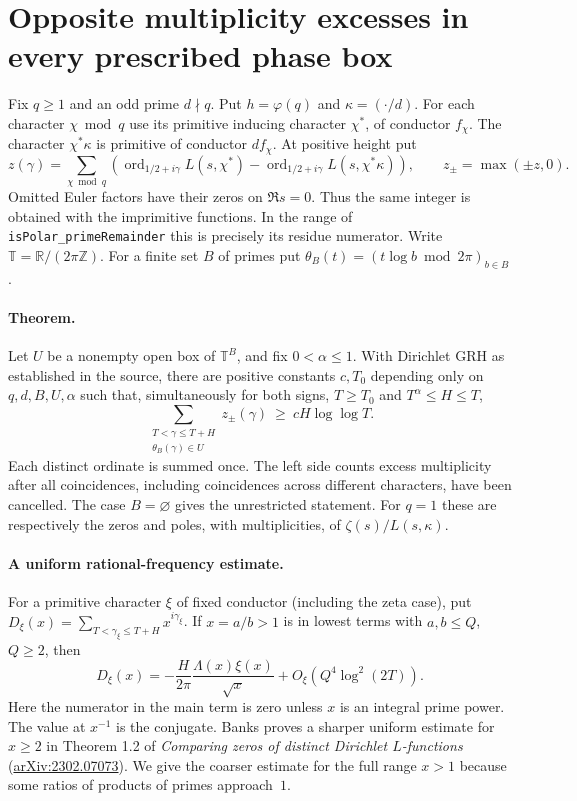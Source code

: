 \section{Opposite multiplicity excesses in every prescribed phase box}
\label{sec:localized}

Fix $q\ge1$ and an odd prime $d\nmid q$. Put $h=\varphi(q)$ and
$\kappa=(\cdot/d)$. For each character $\chi\bmod q$ use its primitive
inducing character $\chi^*$, of conductor $f_\chi$. The character
$\chi^*\kappa$ is primitive of conductor $df_\chi$. At positive height put
\[
 z(\gamma)=\sum_{\chi\bmod q}
 \left(\operatorname{ord}_{1/2+i\gamma}L(s,\chi^*)
      -\operatorname{ord}_{1/2+i\gamma}L(s,\chi^*\kappa)\right),
 \qquad z_\pm=\max(\pm z,0).
\]
Omitted Euler factors have their zeros on $\Re s=0$. Thus the same integer
is obtained with the imprimitive functions. In the range of
\texttt{isPolar\_primeRemainder} this is precisely its residue numerator.
Write $\mathbb T=\mathbb R/(2\pi\mathbb Z)$. For a finite set $B$ of
primes put $\theta_B(t)=(t\log b\bmod 2\pi)_{b\in B}$.

\paragraph{Theorem.}
Let $U$ be a nonempty open box of $\mathbb T^B$, and fix $0<\alpha\le1$.
With Dirichlet GRH as established in the source, there are positive
constants $c,T_0$ depending only on $q,d,B,U,\alpha$ such that, simultaneously
for both signs, $T\ge T_0$ and $T^\alpha\le H\le T$,
\begin{equation}
 \sum_{\substack{T<\gamma\le T+H\\\theta_B(\gamma)\in U}}z_\pm(\gamma)
    \ \ge\ c H\log\log T .
 \label{eq:phase-excess}
\end{equation}
Each distinct ordinate is summed once. The left side counts excess
multiplicity after all coincidences, including coincidences across
different characters, have been cancelled. The case $B=\varnothing$
gives the unrestricted statement. For $q=1$ these are respectively the
zeros and poles, with multiplicities, of $\zeta(s)/L(s,\kappa)$.

\paragraph{A uniform rational-frequency estimate.}
For a primitive character $\xi$ of fixed conductor (including the
zeta case), put
$D_\xi(x)=\sum_{T<\gamma_\xi\le T+H}x^{i\gamma_\xi}$.
If $x=a/b>1$ is in lowest terms with $a,b\le Q$, $Q\ge2$, then
\begin{equation}
 D_\xi(x)=-\frac{H}{2\pi}\frac{\Lambda(x)\xi(x)}{\sqrt{x}}
              +O_\xi(Q^4\log^2(2T)).
 \label{eq:rational-landau}
\end{equation}
Here the numerator in the main term is zero unless $x$ is an integral
prime power. The value at $x^{-1}$ is the conjugate. Banks proves a
sharper uniform estimate for $x\ge2$ in Theorem 1.2 of
\emph{Comparing zeros of distinct Dirichlet $L$-functions}
(\href{https://arxiv.org/abs/2302.07073}{arXiv:2302.07073}).
We give the coarser estimate for the full range $x>1$ because some
ratios of products of primes approach~$1$.

